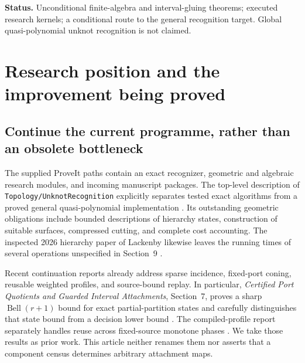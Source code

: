 \documentclass[11pt,a4paper]{article}
\theoremstyle{remark}\newtheorem{remark}[theorem]{Remark}
\newcommand{\Bell}{\operatorname{Bell}}
\begin{document}
\begin{titlepage}
\begin{abstract}
A gluing theorem, geometric compatibility contract, source-bound reduction certificates, and a supplied-assembly complexity theorem connect the algebra to the unknot programme. Under polynomial auxiliary costs, width $O(\log^2 n)$ suffices for an $n^{O(\log n)}$ assembly search. No complete geometric producer with that width is established here. The accompanying standard-library implementation passes 18 test methods and independent exhaustive audits. Measurements include substantial preprocessing slowdowns and a cycle-rich rejection workload with a measured local gain; none is a native knot-recognition benchmark.
\end{abstract}
\vfill
\noindent\textbf{Status.} Unconditional finite-algebra and interval-gluing theorems; executed research kernels; a conditional route to the general recognition target. Global quasi-polynomial unknot recognition is not claimed.
\end{titlepage}

\begingroup
\footnotesize
\setlength{\parskip}{0pt}
\tableofcontents
\endgroup
\newpage

\section{Research position and the improvement being proved}\label{sec:position}
\subsection{Continue the current programme, rather than an obsolete bottleneck}
The supplied ProveIt paths contain an exact recognizer, geometric and algebraic research modules, and incoming manuscript packages. The top-level description of \texttt{Topology/UnknotRecognition} explicitly separates tested exact algorithms from a proved general quasi-polynomial implementation \cite{repo}. Its outstanding geometric obligations include bounded descriptions of hierarchy states, construction of suitable surfaces, compressed cutting, and complete cost accounting. The inspected 2026 hierarchy paper of Lackenby likewise leaves the running times of several operations unspecified in Section~9 \cite{lackenby}.

Recent continuation reports already address sparse incidence, fixed-port coning, reusable weighted profiles, and source-bound replay. In particular, \emph{Certified Port Quotients and Guarded Interval Attachments}, Section~7, proves a sharp $\Bell(r+1)$ bound for exact partial-partition states and carefully distinguishes that state bound from a decision lower bound \cite{ports}. The compiled-profile report separately handles reuse across fixed-source monotone phases \cite{compiled}. We take those results as prior work. This article neither renames them nor asserts that a component census determines arbitrary attachment maps.
\end{document}
